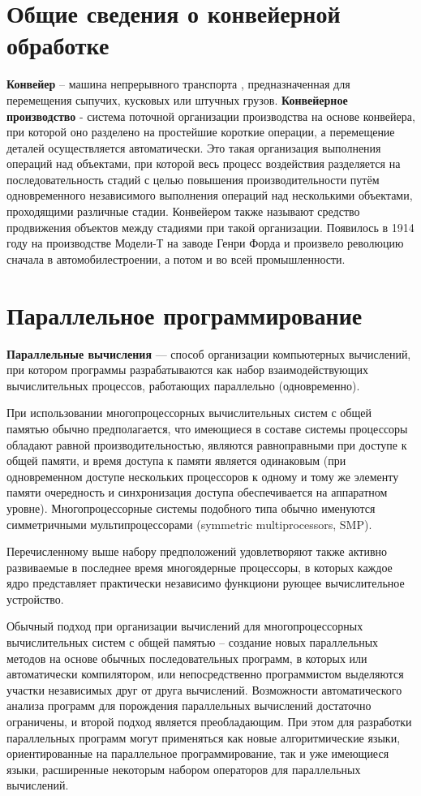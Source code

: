 \documentclass[12pt]{report}
\begin{document}
\section{Общие сведения о конвейерной обработке}
\par
\textbf{Конвейер} – машина непрерывного транспорта \cite{mednov}, предназначенная для перемещения сыпучих, кусковых или штучных грузов.
\newline
\textbf{Конвейерное производство} - система поточной организации производства на основе конвейера, при которой оно разделено на простейшие короткие операции, а перемещение деталей осуществляется автоматически. Это такая организация выполнения операций над объектами, при которой весь процесс воздействия разделяется на последовательность стадий с целью повышения производительности путём одновременного независимого выполнения операций над несколькими объектами, проходящими различные стадии. Конвейером также называют средство продвижения объектов между стадиями при такой организации\cite{wiki}. Появилось в 1914 году на производстве Модели-Т на заводе Генри Форда\cite{ford} и произвело революцию сначала в автомобилестроении, а потом и во всей промышленности.

\section{Параллельное программирование}
\textbf{Параллельные вычисления} — способ организации компьютерных вычислений, при котором программы разрабатываются как набор взаимодействующих вычислительных процессов, работающих параллельно (одновременно). 

При использовании многопроцессорных вычислительных систем с общей памятью обычно предполагается, что имеющиеся в составе системы процессоры обладают равной производительностью, являются равноправными при доступе к общей памяти, и время доступа к памяти является одинаковым (при одновременном доступе нескольких процессоров к одному и тому же элементу памяти очередность и синхронизация доступа обеспечивается на аппаратном уровне). Многопроцессорные системы подобного типа обычно именуются симметричными мультипроцессорами (symmetric multiprocessors, SMP).

Перечисленному выше набору предположений удовлетворяют также активно развиваемые в последнее время многоядерные процессоры, в которых каждое ядро представляет практически независимо функциони рующее вычислительное устройство.

Обычный подход при организации вычислений для многопроцессорных вычислительных систем с общей памятью – создание новых параллельных методов на основе обычных последовательных программ, в которых или автоматически компилятором, или непосредственно программистом выделяются участки независимых друг от друга вычислений. Возможности автоматического анализа программ для порождения параллельных вычислений достаточно ограничены, и второй подход является преобладающим. При этом для разработки параллельных программ могут применяться как новые алгоритмические языки, ориентированные на параллельное программирование, так и уже имеющиеся языки, расширенные некоторым набором операторов для параллельных вычислений.
\end{document}
